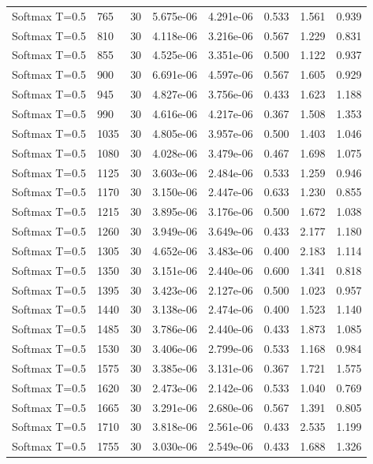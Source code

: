 \begin{scriptsize}
\begin{longtable}{llrrrrrr}
Softmax T=0.5 & 765 & 30 & 5.675e-06 & 4.291e-06 & 0.533 & 1.561 & 0.939 \\
Softmax T=0.5 & 810 & 30 & 4.118e-06 & 3.216e-06 & 0.567 & 1.229 & 0.831 \\
Softmax T=0.5 & 855 & 30 & 4.525e-06 & 3.351e-06 & 0.500 & 1.122 & 0.937 \\
Softmax T=0.5 & 900 & 30 & 6.691e-06 & 4.597e-06 & 0.567 & 1.605 & 0.929 \\
Softmax T=0.5 & 945 & 30 & 4.827e-06 & 3.756e-06 & 0.433 & 1.623 & 1.188 \\
Softmax T=0.5 & 990 & 30 & 4.616e-06 & 4.217e-06 & 0.367 & 1.508 & 1.353 \\
Softmax T=0.5 & 1035 & 30 & 4.805e-06 & 3.957e-06 & 0.500 & 1.403 & 1.046 \\
Softmax T=0.5 & 1080 & 30 & 4.028e-06 & 3.479e-06 & 0.467 & 1.698 & 1.075 \\
Softmax T=0.5 & 1125 & 30 & 3.603e-06 & 2.484e-06 & 0.533 & 1.259 & 0.946 \\
Softmax T=0.5 & 1170 & 30 & 3.150e-06 & 2.447e-06 & 0.633 & 1.230 & 0.855 \\
Softmax T=0.5 & 1215 & 30 & 3.895e-06 & 3.176e-06 & 0.500 & 1.672 & 1.038 \\
Softmax T=0.5 & 1260 & 30 & 3.949e-06 & 3.649e-06 & 0.433 & 2.177 & 1.180 \\
Softmax T=0.5 & 1305 & 30 & 4.652e-06 & 3.483e-06 & 0.400 & 2.183 & 1.114 \\
Softmax T=0.5 & 1350 & 30 & 3.151e-06 & 2.440e-06 & 0.600 & 1.341 & 0.818 \\
Softmax T=0.5 & 1395 & 30 & 3.423e-06 & 2.127e-06 & 0.500 & 1.023 & 0.957 \\
Softmax T=0.5 & 1440 & 30 & 3.138e-06 & 2.474e-06 & 0.400 & 1.523 & 1.140 \\
Softmax T=0.5 & 1485 & 30 & 3.786e-06 & 2.440e-06 & 0.433 & 1.873 & 1.085 \\
Softmax T=0.5 & 1530 & 30 & 3.406e-06 & 2.799e-06 & 0.533 & 1.168 & 0.984 \\
Softmax T=0.5 & 1575 & 30 & 3.385e-06 & 3.131e-06 & 0.367 & 1.721 & 1.575 \\
Softmax T=0.5 & 1620 & 30 & 2.473e-06 & 2.142e-06 & 0.533 & 1.040 & 0.769 \\
Softmax T=0.5 & 1665 & 30 & 3.291e-06 & 2.680e-06 & 0.567 & 1.391 & 0.805 \\
Softmax T=0.5 & 1710 & 30 & 3.818e-06 & 2.561e-06 & 0.433 & 2.535 & 1.199 \\
Softmax T=0.5 & 1755 & 30 & 3.030e-06 & 2.549e-06 & 0.433 & 1.688 & 1.326 \\

\end{longtable}
\end{scriptsize}
